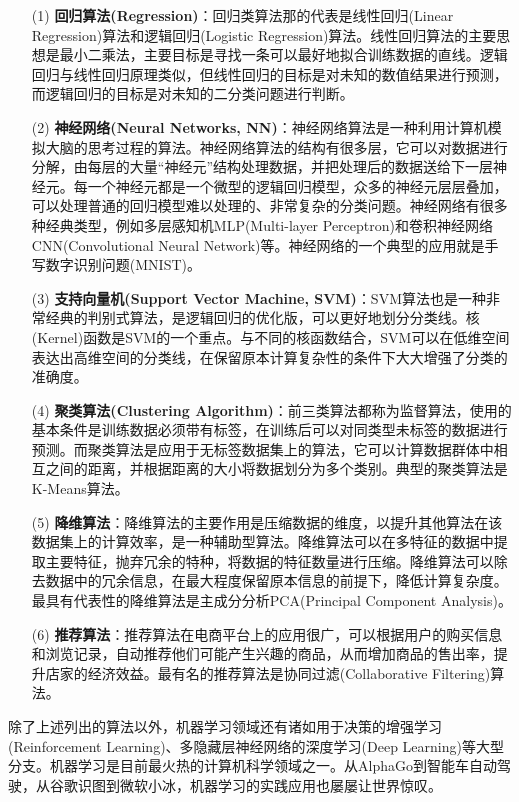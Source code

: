 \begin{enumerate}
	\item [(1)] \textbf{回归算法(Regression)}：回归类算法那的代表是线性回归(Linear Regression)算法和逻辑回归(Logistic Regression)算法。线性回归算法的主要思想是最小二乘法，主要目标是寻找一条可以最好地拟合训练数据的直线。逻辑回归与线性回归原理类似，但线性回归的目标是对未知的数值结果进行预测，而逻辑回归的目标是对未知的二分类问题进行判断。
	\item [(2)] \textbf{神经网络(Neural Networks, NN)}：神经网络算法是一种利用计算机模拟大脑的思考过程的算法。神经网络算法的结构有很多层，它可以对数据进行分解，由每层的大量“神经元”结构处理数据，并把处理后的数据送给下一层神经元。每一个神经元都是一个微型的逻辑回归模型，众多的神经元层层叠加，可以处理普通的回归模型难以处理的、非常复杂的分类问题。神经网络有很多种经典类型，例如多层感知机MLP(Multi-layer Perceptron)和卷积神经网络CNN(Convolutional Neural Network)等。神经网络的一个典型的应用就是手写数字识别问题(MNIST)。
	\item [(3)] \textbf{支持向量机(Support Vector Machine, SVM)}：SVM算法也是一种非常经典的判别式算法，是逻辑回归的优化版，可以更好地划分分类线。核(Kernel)函数是SVM的一个重点。与不同的核函数结合，SVM可以在低维空间表达出高维空间的分类线，在保留原本计算复杂性的条件下大大增强了分类的准确度。
	\item [(4)] \textbf{聚类算法(Clustering Algorithm)}：前三类算法都称为监督算法，使用的基本条件是训练数据必须带有标签，在训练后可以对同类型未标签的数据进行预测。而聚类算法是应用于无标签数据集上的算法，它可以计算数据群体中相互之间的距离，并根据距离的大小将数据划分为多个类别。典型的聚类算法是K-Means算法。
	\item[(5)] \textbf{降维算法}：降维算法的主要作用是压缩数据的维度，以提升其他算法在该数据集上的计算效率，是一种辅助型算法。降维算法可以在多特征的数据中提取主要特征，抛弃冗余的特种，将数据的特征数量进行压缩。降维算法可以除去数据中的冗余信息，在最大程度保留原本信息的前提下，降低计算复杂度。最具有代表性的降维算法是主成分分析PCA(Principal Component Analysis)。
	\item[(6)] \textbf{推荐算法}：推荐算法在电商平台上的应用很广，可以根据用户的购买信息和浏览记录，自动推荐他们可能产生兴趣的商品，从而增加商品的售出率，提升店家的经济效益。最有名的推荐算法是协同过滤(Collaborative Filtering)算法。
\end{enumerate}

除了上述列出的算法以外，机器学习领域还有诸如用于决策的增强学习(Reinforcement Learning)、多隐藏层神经网络的深度学习(Deep Learning)等大型分支。机器学习是目前最火热的计算机科学领域之一。从AlphaGo到智能车自动驾驶，从谷歌识图到微软小冰，机器学习的实践应用也屡屡让世界惊叹。



